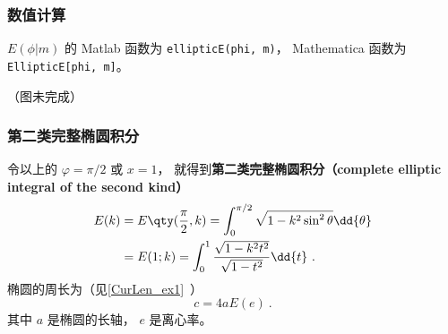 \subsubsection{数值计算}
$E(\phi | m)$ 的 Matlab 函数为 \verb|ellipticE(phi, m)|， %
Mathematica 函数为 \verb|EllipticE[phi, m]|。

（图未完成）


\subsubsection{第二类完整椭圆积分}
令以上的 $\varphi = \pi/2$ 或 $x = 1$， 就得到\textbf{第二类完整椭圆积分（complete elliptic integral of the second kind）}
\begin{equation}
\begin{aligned}
E(k) &= E\qty(\frac{\pi}{2}, k) = \int_0^{\pi/2} \sqrt{1 - k^2\sin^2\theta} \dd{\theta}\\
&= E(1; k) =  \int_0^1 \frac{\sqrt{1 - k^2 t^2}}{\sqrt{1 - t^2}} \dd{t}~.
\end{aligned}
\end{equation}
椭圆的周长为（见\autoref{CurLen_ex1}~）
\begin{equation}
c = 4aE(e)~.
\end{equation}
其中 $a$ 是椭圆的长轴， $e$ 是离心率。
